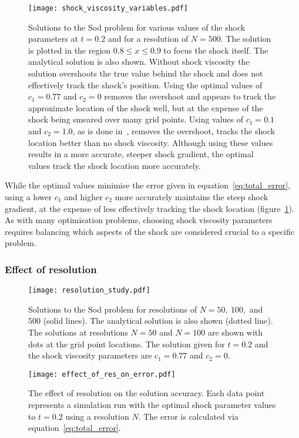 \begin{figure}[t]
  \centering
  \texttt{[image: shock\_viscosity\_variables.pdf]}
  \caption{Solutions to the Sod problem for various values of the shock parameters at $t=0.2$ and for a resolution of $N=500$. The solution is plotted in the region $0.8 \leq x \leq 0.9$ to focus the shock itself. The analytical solution is also shown. Without shock viscosity the solution overshoots the true value behind the shock and does not effectively track the shock's position. Using the optimal values of $c_1 = 0.77$ and $c_2 = 0$ removes the overshoot and appears to track the approximate location of the shock well, but at the expense of the shock being smeared over many grid points. Using values of $c_1 = 0.1$ and $c_2 = 1.0$, as is done in~\cite{arberStaggeredGridLagrangian2001}, removes the overshoot, tracks the shock location better than no shock viscosity. Although using these values results in a more accurate, steeper shock gradient, the optimal values track the shock location more accurately.}%
  \label{fig:shock_viscosity_variables}
\end{figure}

While the optimal values minimise the error given in equation~\ref{eq:total_error}, using a lower $c_1$ and higher $c_2$ more accurately maintains the steep shock gradient, at the expense of less effectively tracking the shock location (figure~\ref{fig:shock_viscosity_variables}). As with many optimisation problems, choosing shock viscosity parameters requires balancing which aspects of the shock are considered crucial to a specific problem. 

\subsubsection{Effect of resolution}

\begin{figure}[t]
  \centering
  \texttt{[image: resolution\_study.pdf]}
  \caption{Solutions to the Sod problem for resolutions of $N=50,\ 100,$ and $500$ (solid lines). The analytical solution is also shown (dotted line). The solutions at resolutions $N=50$ and $N=100$ are shown with dots at the grid point locations. The solution given for $t=0.2$ and the shock viscosity parameters are $c_1 = 0.77$ and $c_2 = 0$.}
  \label{fig:resolution_study}
\end{figure}

\begin{figure}[t]
  \centering
  \texttt{[image: effect\_of\_res\_on\_error.pdf]}
  \caption{The effect of resolution on the solution accuracy. Each data point represents a simulation run with the optimal shock parameter values to $t=0.2$ using a resolution $N$. The error is calculated via equation~\ref{eq:total_error}.}%
  \label{fig:effect_of_res_on_error}
\end{figure}

